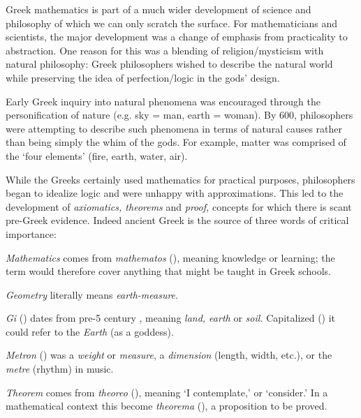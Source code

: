 Greek mathematics is part of a much wider development of science and philosophy of which we can only scratch the surface. For mathematicians and scientists, the major development was a change of emphasis from practicality to abstraction. One reason for this was a blending of religion/mysticism with natural philosophy: Greek philosophers wished to describe the natural world while preserving the idea of perfection/logic in the gods' design.\goodbreak

Early Greek inquiry into natural phenomena was encouraged through the personification of nature (e.g.{} sky = man, earth = woman). By 600\BC, philosophers were attempting to describe such phenomena in terms of natural causes rather than being simply the whim of the gods. For example, matter was  comprised of the `four elements' (fire, earth, water, air).\smallbreak

While the Greeks certainly used mathematics for practical purposes, philosophers began to idealize logic and were unhappy with approximations. This led to the development of \emph{axiomatics, theorems} and \emph{proof,} concepts for which there is scant pre-Greek evidence. Indeed ancient Greek is the source of three words of critical importance:\vspace{-3pt}
\begin{description}\itemsep0pt
	\item[]\emph{Mathematics} comes from \emph{mathematos} (), meaning knowledge or learning; the term would therefore cover anything that might be taught in Greek schools.
	\item[]\emph{Geometry} literally means \emph{earth-measure}.\vspace{-6pt}
	\begin{description}\itemsep0pt
	\item[]\emph{Gi} () dates from pre-5\th{} century \!\BC{}, meaning \emph{land, earth} or \emph{soil.} Capitalized () it could refer to the \emph{Earth} (as a goddess).
	\item[]\emph{Metron} () was a \emph{weight} or \emph{measure}, a \emph{dimension}  (length, width, etc.), or the \emph{metre} (rhythm) in music.
	\end{description}\vspace{-6pt}
	\item[]\emph{Theorem} comes from \emph{theoreo} (), meaning `I contemplate,' or `consider.' In a mathematical context this become \emph{theorema} (), a proposition to be proved.
\end{description}

